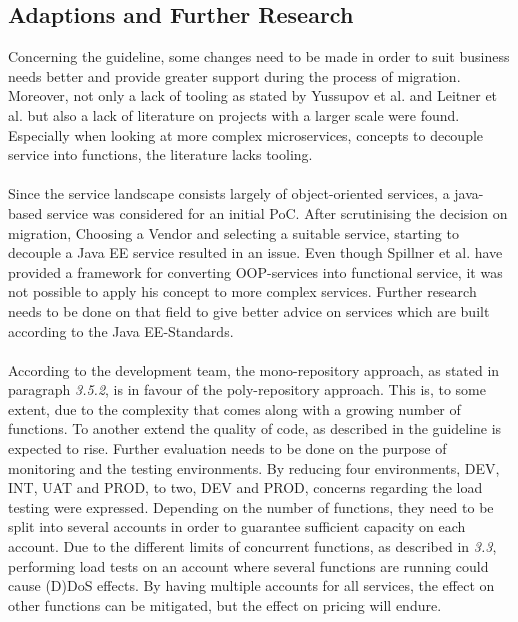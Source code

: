 \documentclass[a4paper,twoside,11pt, pagesize]{scrartcl}
\begin{document}
\begin{spacing}{1.2}
\subsection{Adaptions and Further Research}

Concerning the guideline, some changes need to be made in order to suit business needs better and provide greater support during the process of migration. Moreover, not only a lack of tooling as stated by Yussupov et al. and Leitner et al. but also a lack of literature on projects with a larger scale were found. Especially when looking at more complex microservices, concepts to decouple service into functions, the literature lacks tooling. \\\\
Since the service landscape consists largely of object-oriented services, a java-based service was considered for an initial PoC. After scrutinising the decision on migration, Choosing a Vendor and selecting a suitable service, starting to decouple a Java EE service resulted in an issue. Even though Spillner et al. have provided a framework for converting OOP-services into functional service, it was not possible to apply his concept to more complex services. Further research needs to be done on that field to give better advice on services which are built according to the Java EE-Standards. \\\\
According to the development team, the mono-repository approach, as stated in paragraph \textit{3.5.2}, is in favour of the poly-repository approach. This is, to some extent, due to the complexity that comes along with a growing number of functions. To another extend the quality of code, as described in the guideline is expected to rise. Further evaluation needs to be done on the purpose of monitoring and the testing environments. By reducing four environments, DEV, INT, UAT and PROD, to two, DEV and PROD, concerns regarding the load testing were expressed. Depending on the number of functions, they need to be split into several accounts in order to guarantee sufficient capacity on each account. Due to the different limits of concurrent functions, as described in \textit{3.3}, performing load tests on an account where several functions are running could cause (D)DoS effects. By having multiple accounts for all services, the effect on other functions can be mitigated, but the effect on pricing will endure.  
\newpage

\end{spacing}
\end{document}
